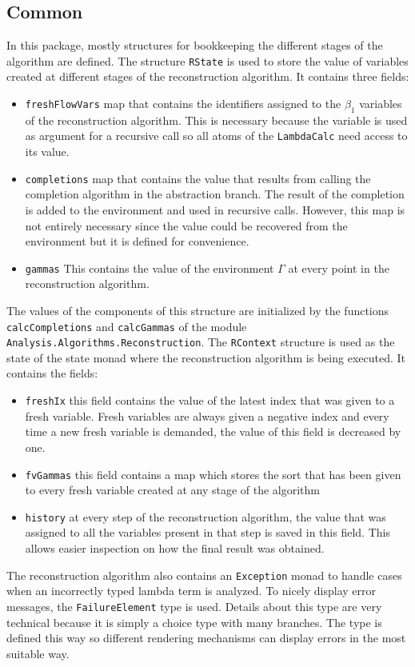 \documentclass[8pt]{extarticle}
\begin{document}
\subsection{Common}
In this package, mostly structures for bookkeeping the different stages of the algorithm are defined. The structure \verb+RState+ is used to store the value of variables created at different stages of the reconstruction algorithm. It contains three fields:
\begin{itemize}
\item \verb+freshFlowVars+ map that contains the identifiers assigned to the $\beta_1$ variables of the reconstruction algorithm. This is necessary because the variable is used as argument for a recursive call so all atoms of the \verb+LambdaCalc+ need access to its value.
\item \verb+completions+ map that contains the value that results from calling the completion algorithm in the abstraction branch. The result of the completion is added to the environment and used in recursive calls. However, this map is not entirely necessary since the value could be recovered from the environment but it is defined for convenience.
\item \verb+gammas+ This contains the value of the environment $\Gamma$ at every point in the reconstruction algorithm.
\end{itemize}
The values of the components of this structure are initialized by the functions \verb+calcCompletions+ and \verb+calcGammas+ of the module \verb+Analysis.Algorithms.Reconstruction+.
The \verb+RContext+ structure is used as the state of the state monad where the reconstruction algorithm is being executed. It contains the fields:
\begin{itemize}
\item \verb+freshIx+ this field contains the value of the latest index that was given to a fresh variable. Fresh variables are always given a negative index and every time a new fresh variable is demanded, the value of this field is decreased by one.
\item \verb+fvGammas+ this field contains a map which stores the sort that has been given to every fresh variable created at any stage of the algorithm
\item \verb+history+ at every step of the reconstruction algorithm, the value that was assigned to all the variables present in that step is saved in this field. This allows easier inspection on how the final result was obtained.
\end{itemize}
The reconstruction algorithm also contains an \verb+Exception+ monad to handle cases when an incorrectly typed lambda term is analyzed. To nicely display error messages, the \verb+FailureElement+ type is used. Details about this type are very technical because it is simply a choice type with many branches. The type is defined this way so different rendering mechanisms can display errors in the most suitable way.
\end{document}

